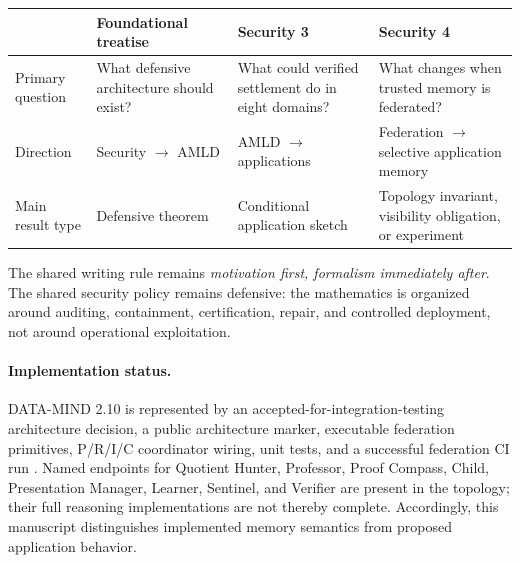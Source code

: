 \documentclass[11pt,oneside]{book}
\theoremstyle{definition}
\theoremstyle{remark}
\begin{document}
\begin{center}
\begin{tabularx}{0.95\textwidth}{>{\raggedright\arraybackslash}p{}X X X}
\toprule
 & Foundational treatise & Security 3 & Security 4 \\
\midrule
Primary question & What defensive architecture should exist? & What could verified settlement do
in eight domains? & What changes when trusted memory is federated? \\
Direction & Security $\rightarrow$ AMLD & AMLD $\rightarrow$ applications & Federation
$\rightarrow$ selective application memory \\
Main result type & Defensive theorem & Conditional application sketch & Topology invariant,
visibility obligation, or experiment \\
\bottomrule
\end{tabularx}
\end{center}

The shared writing rule remains \emph{motivation first, formalism immediately after}. The shared
security policy remains defensive: the mathematics is organized around auditing, containment,
certification, repair, and controlled deployment, not around operational exploitation.

\paragraph{Implementation status.}
DATA-MIND 2.10 is represented by an accepted-for-integration-testing architecture decision, a public
architecture marker, executable federation primitives, P/R/I/C coordinator wiring, unit tests, and a
successful federation CI run \cite{DataMind210Code,DataMind210Run}. Named endpoints for Quotient
Hunter, Professor, Proof Compass, Child, Presentation Manager, Learner, Sentinel, and Verifier are
present in the topology; their full reasoning implementations are not thereby complete. Accordingly,
this manuscript distinguishes implemented memory semantics from proposed application behavior.
\end{document}
